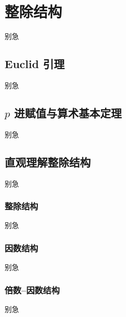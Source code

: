 
\section{整除结构}
\begin{frame}{别急}\end{frame} %
\subsection{Euclid 引理}
\begin{frame}[c]
  \progressnow*
\end{frame}
\begin{frame}{别急}\end{frame} %
\subsection{\texorpdfstring{$p$}{p} 进赋值与算术基本定理}
\begin{frame}[c]
  \progressnow*
\end{frame}
\begin{frame}{别急}\end{frame} %
\subsection{直观理解整除结构}
\begin{frame}[c]
  \progressnow*
\end{frame}
\begin{frame}{别急}\end{frame} %
\subsubsection{整除结构}
\begin{frame}[c]
  \progressnow
\end{frame}
\begin{frame}{别急}\end{frame} %
\subsubsection{因数结构}
\begin{frame}[c]
  \progressnow
\end{frame}
\begin{frame}{别急}\end{frame} %
\subsubsection{倍数–因数结构}
\begin{frame}[c]
  \progressnow
\end{frame}
\begin{frame}{别急}\end{frame} %

